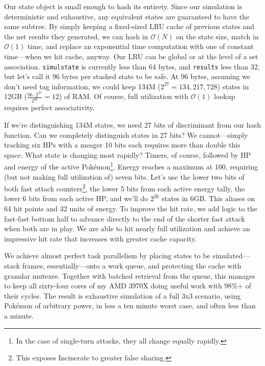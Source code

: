 Our state object is small enough to hash its entirety.
Since our simulation is deterministic and exhaustive, any equivalent states
 are guaranteed to have the same subtree.
By simply keeping a fixed-sized LRU cache of previous states and the net results they
 generated, we can hash in $\mathcal{O}(N)$ on the state size, match in $\mathcal{O}(1)$
 time, and replace an exponential time computation with one of constant time---when we hit cache, anyway.
Our LRU can be global or at the level of a set association.
\texttt{simulstate} is currently less than 64 bytes, and \texttt{results} less than 32, but
 let's call it 96 bytes per stashed state to be safe.
At 96 bytes, assuming we don't need tag information, we could keep 134M ($2^{27} = 134,217,728$) states
 in 12GB ($\frac{96\cdot2^{27}}{2^{30}} = 12$) of RAM\@.
Of course, full utilization with $\mathcal{O}(1)$ lookup requires perfect associativity.

If we're distinguishing 134M states, we need 27 bits of discriminant from our hash function.
Can we completely distinguish states in 27 bits?
We cannot---simply tracking six HPs with a meager 10 bits each requires more than double this space.
What state is changing most rapidly?
Timers, of course, followed by HP and energy of the active Pokémon\footnote{In the case of single-turn attacks, they all change equally rapidly.}.
Energy reaches a maximum at 100, requiring (but not making full utilization of) seven bits.
Let's use the lower two bits of both fast attack counters\footnote{This exposes Incinerate to greater false sharing.},
 the lower 5 bits from each active energy tally, the lower 6 bits from each
 active HP, and we'll do $2^{26}$ states in 6GB\@.
This aliases on 64 hit points and 32 units of energy.
To improve the hit rate, we add logic to the fast-fast bottom half to advance directly
 to the end of the shorter fast attack when both are in play.
We are able to hit nearly full utilization and achieve an impressive hit rate that
 increases with greater cache capacity.

We achieve almost perfect task parallelism by placing states to be simulated---stack frames,
 essentially---onto a work queue, and protecting the cache with granular mutexes.
Together with batched retrieval from the queue, this manages to keep all sixty-four
 cores of my AMD 3970X doing useful work with 98\%+ of their cycles.
The result is exhaustive simulation of a full 3x3 scenario, using Pokémon of arbitrary power,
 in less a ten minute worst case, and often less than a minute.

